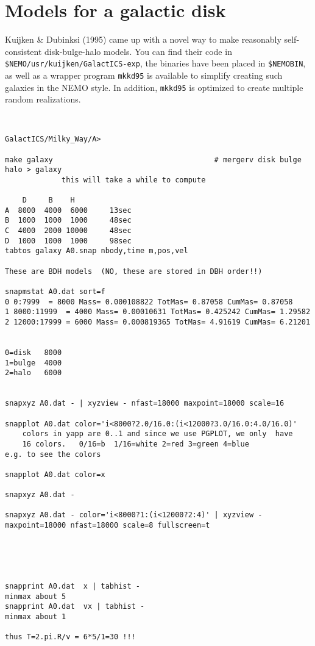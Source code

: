 \section{Models for a galactic disk}

Kuijken \& Dubinksi (1995) came up with a novel way to make reasonably
self-consistent disk-bulge-halo models. You can find
their code in {\tt \$NEMO/usr/kuijken/GalactICS-exp}, the binaries have
been placed in {\tt \$NEMOBIN}, as well as a wrapper program
{\tt mkkd95} is available to simplify creating such galaxies in the
NEMO style. In addition, {\tt mkkd95} is optimized to create
multiple random realizations.

\footnotesize\begin{verbatim}


GalactICS/Milky_Way/A> 

make galaxy                                     # mergerv disk bulge halo > galaxy
             this will take a while to compute

    D     B    H
A  8000  4000  6000     13sec
B  1000  1000  1000     48sec
C  4000  2000 10000     48sec
D  1000  1000  1000     98sec
tabtos galaxy A0.snap nbody,time m,pos,vel

These are BDH models  (NO, these are stored in DBH order!!)

snapmstat A0.dat sort=f
0 0:7999  = 8000 Mass= 0.000108822 TotMas= 0.87058 CumMas= 0.87058
1 8000:11999  = 4000 Mass= 0.00010631 TotMas= 0.425242 CumMas= 1.29582
2 12000:17999 = 6000 Mass= 0.000819365 TotMas= 4.91619 CumMas= 6.21201


0=disk   8000
1=bulge  4000
2=halo   6000


snapxyz A0.dat - | xyzview - nfast=18000 maxpoint=18000 scale=16

snapplot A0.dat color='i<8000?2.0/16.0:(i<12000?3.0/16.0:4.0/16.0)'
    colors in yapp are 0..1 and since we use PGPLOT, we only  have
    16 colors.   0/16=b  1/16=white 2=red 3=green 4=blue
e.g. to see the colors

snapplot A0.dat color=x

snapxyz A0.dat - 

snapxyz A0.dat - color='i<8000?1:(i<12000?2:4)' | xyzview - maxpoint=18000 nfast=18000 scale=8 fullscreen=t





snapprint A0.dat  x | tabhist -
minmax about 5
snapprint A0.dat  vx | tabhist -
minmax about 1

thus T=2.pi.R/v = 6*5/1=30 !!!


\end{verbatim}
